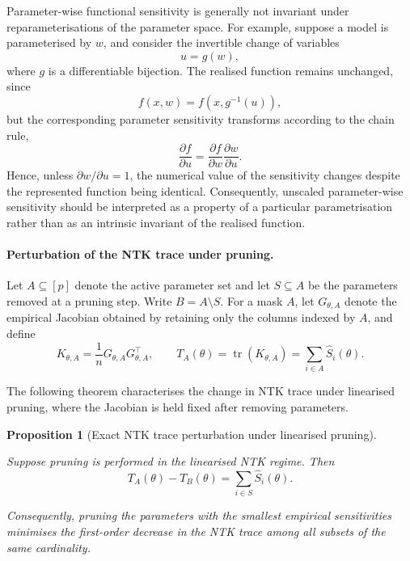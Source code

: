 \documentclass{article}
\newtheorem{proposition}[theorem]{Proposition}
\theoremstyle{definition}
\theoremstyle{remark}
\begin{document}
Parameter-wise functional sensitivity is generally not invariant under reparameterisations of the parameter space. For example, suppose a model is parameterised by \(w\), and consider the invertible change of variables
\[
u = g(w),
\]
where \(g\) is a differentiable bijection. The realised function remains unchanged, since
\[
f(x,w)=f\!\left(x,g^{-1}(u)\right),
\]
but the corresponding parameter sensitivity transforms according to the chain rule,
\[
\frac{\partial f}{\partial u}
=
\frac{\partial f}{\partial w}
\frac{\partial w}{\partial u}.
\]
Hence, unless \(\partial w/\partial u = 1\), the numerical value of the sensitivity changes despite the represented function being identical. Consequently, unscaled parameter-wise sensitivity should be interpreted as a property of a particular parametrisation rather than as an intrinsic invariant of the realised function.



\paragraph{Perturbation of the NTK trace under pruning.}

Let \(A\subseteq[p]\) denote the active parameter set and let
\(S\subseteq A\) be the parameters removed at a pruning step.
Write \(B=A\setminus S\).
For a mask \(A\), let \(G_{\theta,A}\) denote the empirical Jacobian obtained by
retaining only the columns indexed by \(A\), and define
\[
K_{\theta,A}
=
\frac1nG_{\theta,A}G_{\theta,A}^{\top},
\qquad
T_A(\theta)
=
\operatorname{tr}(K_{\theta,A})
=
\sum_{i\in A}\widehat S_i(\theta).
\]

The following theorem characterises the change in NTK trace under
linearised pruning, where the Jacobian is held fixed after removing
parameters.

\begin{proposition}[Exact NTK trace perturbation under linearised pruning]
\label{thm:exact_ntk_trace}

Suppose pruning is performed in the linearised NTK regime.
Then
\[
T_A(\theta)-T_B(\theta)
=
\sum_{i\in S}\widehat S_i(\theta).
\]

Consequently, pruning the parameters with the smallest empirical
sensitivities minimises the first-order decrease in the NTK trace among
all subsets of the same cardinality.

\end{proposition}
\end{document}
